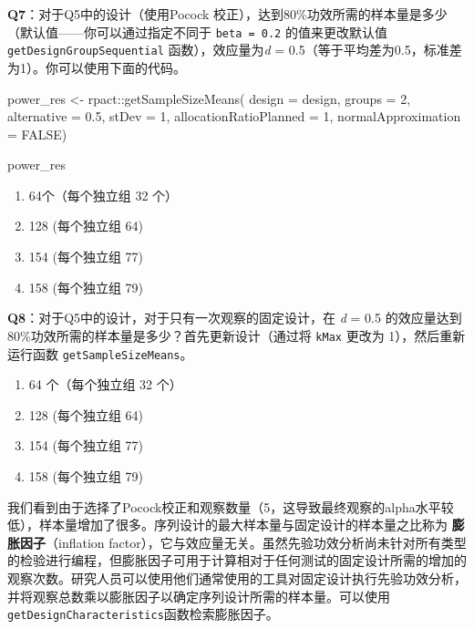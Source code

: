 \documentclass[
  letterpaper,
  DIV=11,
  numbers=noendperiod]{scrreprt}
\newenvironment{Shaded}{\begin{snugshade}}{\end{snugshade}}
\newcommand{\AttributeTok}[1]{\textcolor[rgb]{0.40,0.45,0.13}{#1}}
\newcommand{\ConstantTok}[1]{\textcolor[rgb]{0.56,0.35,0.01}{#1}}
\newcommand{\DecValTok}[1]{\textcolor[rgb]{0.68,0.00,0.00}{#1}}
\newcommand{\FloatTok}[1]{\textcolor[rgb]{0.68,0.00,0.00}{#1}}
\newcommand{\FunctionTok}[1]{\textcolor[rgb]{0.28,0.35,0.67}{#1}}
\newcommand{\NormalTok}[1]{\textcolor[rgb]{0.00,0.23,0.31}{#1}}
\newcommand{\OtherTok}[1]{\textcolor[rgb]{0.00,0.23,0.31}{#1}}
\newcommand{\SpecialCharTok}[1]{\textcolor[rgb]{0.37,0.37,0.37}{#1}}
\providecommand{\tightlist}{%
  \setlength{\itemsep}{0pt}\setlength{\parskip}{0pt}}\usepackage{longtable,booktabs,array}
\begin{document}
\textbf{Q7}：对于Q5中的设计（使用Pocock
校正），达到80\%功效所需的样本量是多少（默认值------你可以通过指定不同于
\texttt{beta\ =\ 0.2} 的值来更改默认值\texttt{getDesignGroupSequential}
函数），效应量为\emph{d} =
0.5（等于平均差为0.5，标准差为1）。你可以使用下面的代码。

\begin{Shaded}
\begin{Highlighting}[]
\NormalTok{power\_res }\OtherTok{\textless{}{-}}\NormalTok{ rpact}\SpecialCharTok{::}\FunctionTok{getSampleSizeMeans}\NormalTok{(}
  \AttributeTok{design =}\NormalTok{ design,}
  \AttributeTok{groups =} \DecValTok{2}\NormalTok{,}
  \AttributeTok{alternative =} \FloatTok{0.5}\NormalTok{, }
  \AttributeTok{stDev =} \DecValTok{1}\NormalTok{, }
  \AttributeTok{allocationRatioPlanned =} \DecValTok{1}\NormalTok{,}
  \AttributeTok{normalApproximation =} \ConstantTok{FALSE}\NormalTok{)}

\NormalTok{power\_res}
\end{Highlighting}
\end{Shaded}

\begin{enumerate}
\def\labelenumi{\Alph{enumi})}
\tightlist
\item
  64个（每个独立组 32 个）
\item
  128 (每个独立组 64)
\item
  154 (每个独立组 77)
\item
  158 (每个独立组 79)
\end{enumerate}

\textbf{Q8}：对于Q5中的设计，对于只有一次观察的固定设计，在 \emph{d} =
0.5 的效应量达到80\%功效所需的样本量是多少？首先更新设计（通过将
\texttt{kMax} 更改为 1），然后重新运行函数 \texttt{getSampleSizeMeans}。

\begin{enumerate}
\def\labelenumi{\Alph{enumi})}
\tightlist
\item
  64 个（每个独立组 32 个）
\item
  128 (每个独立组 64)
\item
  154 (每个独立组 77)
\item
  158 (每个独立组 79)
\end{enumerate}

我们看到由于选择了Pocock校正和观察数量（5，这导致最终观察的alpha水平较低），样本量增加了很多。序列设计的最大样本量与固定设计的样本量之比称为
\textbf{膨胀因子}（inflation
factor），它与效应量无关。虽然先验功效分析尚未针对所有类型的检验进行编程，但膨胀因子可用于计算相对于任何测试的固定设计所需的增加的观察次数。研究人员可以使用他们通常使用的工具对固定设计执行先验功效分析，并将观察总数乘以膨胀因子以确定序列设计所需的样本量。可以使用\texttt{getDesignCharacteristics}函数检索膨胀因子。
\end{document}
